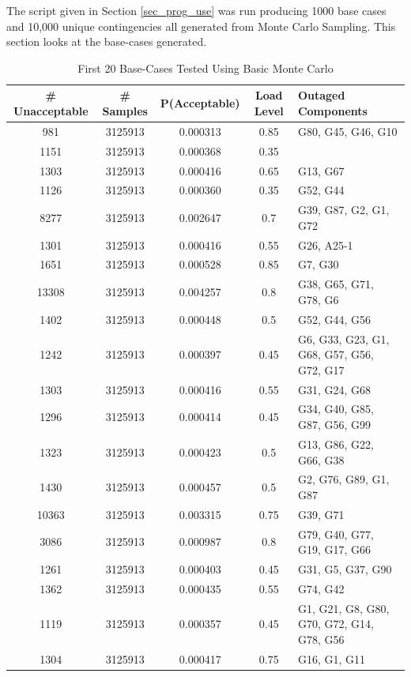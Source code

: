 \documentclass[a4paper,oneside,12pt]{report}
\begin{document}
The script given in Section \ref{sec_prog_use} was run producing 1000 base cases and 10,000 unique contingencies all generated from Monte Carlo Sampling. This section looks at the base-cases generated.

\begin{table}
\caption{First 20 Base-Cases Tested Using Basic Monte Carlo}
\label{table_results_summary}
\centering
\begin{tabular}{c||c||c||c||l}
\bfseries \# Unacceptable & \bfseries \# Samples & \bfseries P(Acceptable) & \bfseries Load Level & \bfseries Outaged Components \\
\hline \hline
981   & 3125913 & 0.000313 & 0.85 & G80, G45, G46, G10  \\  
1151  & 3125913 & 0.000368 & 0.35 &   \\  
1303  & 3125913 & 0.000416 & 0.65 & G13, G67  \\  
1126  & 3125913 & 0.000360 & 0.35 & G52, G44  \\  
8277  & 3125913 & 0.002647 & 0.7  & G39, G87, G2, G1, G72  \\  
1301  & 3125913 & 0.000416 & 0.55 & G26, A25-1  \\  
1651  & 3125913 & 0.000528 & 0.85 & G7, G30  \\  
13308 & 3125913 & 0.004257 & 0.8  & G38, G65, G71, G78, G6  \\  
1402  & 3125913 & 0.000448 & 0.5  & G52, G44, G56  \\  
1242  & 3125913 & 0.000397 & 0.45 & G6, G33, G23, G1, G68, G57, G56, G72, G17  \\  
1303  & 3125913 & 0.000416 & 0.55 & G31, G24, G68  \\  
1296  & 3125913 & 0.000414 & 0.45 & G34, G40, G85, G87, G56, G99  \\  
1323  & 3125913 & 0.000423 & 0.5  & G13, G86, G22, G66, G38  \\  
1430  & 3125913 & 0.000457 & 0.5  & G2, G76, G89, G1, G87  \\  
10363 & 3125913 & 0.003315 & 0.75 & G39, G71  \\  
3086  & 3125913 & 0.000987 & 0.8  & G79, G40, G77, G19, G17, G66  \\  
1261  & 3125913 & 0.000403 & 0.45 & G31, G5, G37, G90  \\  
1362  & 3125913 & 0.000435 & 0.55 & G74, G42  \\  
1119  & 3125913 & 0.000357 & 0.45 & G1, G21, G8, G80, G70, G72, G14, G78, G56  \\  
1304  & 3125913 & 0.000417 & 0.75 & G16, G1, G11  \\  
\hline
\end{tabular}\\
\end{table}
\end{document}
